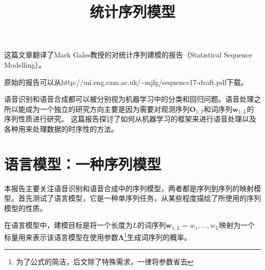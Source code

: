 \documentclass[letterpaper,10pt,oneside]{article}
\begin{document}
\title{统计序列模型}
\maketitle
这篇文章翻译了Mark Gales教授的对统计序列建模的报告（Statistical Sequence Modelling）。

原始的报告可以从http://mi.eng.cam.ac.uk/\textasciitilde mjfg/sequence17-draft.pdf下载。

语音识别和语音合成都可以被分别视为机器学习中的分类和回归问题。语音处理之所以能成为一个独立的研究方向主要是因为需要对观测序列$\mathbf{O}_{1:T}$和词序列$\mathbf{w}_{1:L}$的序列性质进行研究。
这篇报告探讨了如何从机器学习的框架来进行语音处理以及各种用来处理数据的时序性的方法。

\section{语言模型：一种序列模型}
本报告主要关注语音识别和语音合成中的序列模型，两者都是序列到序列的映射模型。首先测试了语言模型，它是一种单序列任务，从某些程度描绘了所使用的序列模型的性质。

在语言模型中，建模目标是将一个长度为$L$的词序列$\mathbf{w}_{1:L}=w_1,\dots,w_L$映射为一个标量用来表示该语言模型在使用参数$\bm{\Lambda}$\footnote{为了公式的简洁，后文除了特殊需求，一律将参数省去}生成词序列的概率。
\end{document}
